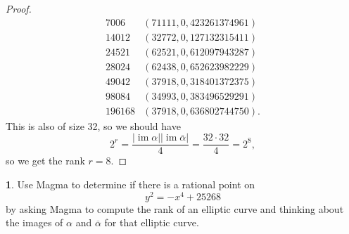\documentclass[12pt]{article}
\DeclareMathOperator{\im}{im}
\theoremstyle{definition}
\newtheorem{ex}{}
\begin{document}
\begin{proof}
\begin{equation*}
\begin{array}{r|c}
			7006             & (71111, 0, 423261374961)  \\
			14012            & (32772, 0, 127132315411)  \\
			24521            & (62521, 0, 612097943287)  \\
			28024            & (62438, 0, 652623982229)  \\
			49042            & (37918, 0, 318401372375)  \\
			98084            & (34993, 0, 383496529291)  \\
			196168           & (37918, 0, 636802744750).
		\end{array}
	\end{equation*}
	This is also of size 32, so we should have \begin{equation*}
		2^r = \frac{|\im\alpha||\im\overline{\alpha}|}{4} = \frac{32\cdot 32}{4} = 2^8,
	\end{equation*}
	so we get the rank $r = 8$.
\end{proof}

\begin{ex}
	Use Magma to determine if there is a rational point on
	\[
		y^{2} = -x^{4} + 25268
	\]
	by asking Magma to compute the rank of an elliptic curve and thinking
	about the images of $\alpha$ and $\overline{\alpha}$ for that elliptic curve.
\end{ex}
\end{document}
